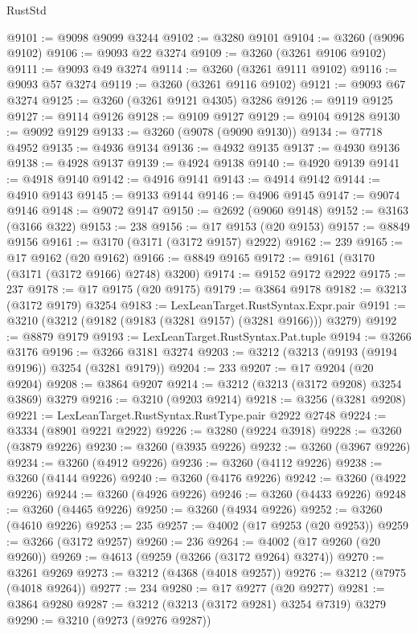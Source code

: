 \begin{lexlean}{RustStd}
\begin{coremodule}
{\begin{coremodule}
{{{{{{{{{{{{{{{{{{{{{{{{{{@9101 := @9098 @9099 @3244
@9102 := @3280 @9101
@9104 := @3260 (@9096 @9102)
@9106 := @9093 @22 @3274
@9109 := @3260 (@3261 @9106 @9102)
@9111 := @9093 @49 @3274
@9114 := @3260 (@3261 @9111 @9102)
@9116 := @9093 @57 @3274
@9119 := @3260 (@3261 @9116 @9102)
@9121 := @9093 @67 @3274
@9125 := @3260 (@3261 @9121 @4305) @3286
@9126 := @9119 @9125
@9127 := @9114 @9126
@9128 := @9109 @9127
@9129 := @9104 @9128
@9130 := @9092 @9129
@9133 := @3260 (@9078 (@9090 @9130))
@9134 := @7718 @4952
@9135 := @4936 @9134
@9136 := @4932 @9135
@9137 := @4930 @9136
@9138 := @4928 @9137
@9139 := @4924 @9138
@9140 := @4920 @9139
@9141 := @4918 @9140
@9142 := @4916 @9141
@9143 := @4914 @9142
@9144 := @4910 @9143
@9145 := @9133 @9144
@9146 := @4906 @9145
@9147 := @9074 @9146
@9148 := @9072 @9147
@9150 := @2692 (@9060 @9148)
@9152 := @3163 (@3166 @322)
@9153 := 238
@9156 := @17 @9153 (@20 @9153)
@9157 := @8849 @9156
@9161 := @3170 (@3171 (@3172 @9157) @2922)
@9162 := 239
@9165 := @17 @9162 (@20 @9162)
@9166 := @8849 @9165
@9172 := @9161 (@3170 (@3171 (@3172 @9166) @2748) @3200)
@9174 := @9152 @9172 @2922
@9175 := 237
@9178 := @17 @9175 (@20 @9175)
@9179 := @3864 @9178
@9182 := @3213 (@3172 @9179) @3254
@9183 := LexLeanTarget.RustSyntax.Expr.pair
@9191 := @3210 (@3212 (@9182 (@9183 (@3281 @9157) (@3281 @9166))) @3279)
@9192 := @8879 @9179
@9193 := LexLeanTarget.RustSyntax.Pat.tuple
@9194 := @3266 @3176
@9196 := @3266 @3181 @3274
@9203 := @3212 (@3213 (@9193 (@9194 @9196)) @3254 (@3281 @9179))
@9204 := 233
@9207 := @17 @9204 (@20 @9204)
@9208 := @3864 @9207
@9214 := @3212 (@3213 (@3172 @9208) @3254 @3869) @3279
@9216 := @3210 (@9203 @9214)
@9218 := @3256 (@3281 @9208)
@9221 := LexLeanTarget.RustSyntax.RustType.pair @2922 @2748
@9224 := @3334 (@8901 @9221 @2922)
@9226 := @3280 (@9224 @3918)
@9228 := @3260 (@3879 @9226)
@9230 := @3260 (@3935 @9226)
@9232 := @3260 (@3967 @9226)
@9234 := @3260 (@4912 @9226)
@9236 := @3260 (@4112 @9226)
@9238 := @3260 (@4144 @9226)
@9240 := @3260 (@4176 @9226)
@9242 := @3260 (@4922 @9226)
@9244 := @3260 (@4926 @9226)
@9246 := @3260 (@4433 @9226)
@9248 := @3260 (@4465 @9226)
@9250 := @3260 (@4934 @9226)
@9252 := @3260 (@4610 @9226)
@9253 := 235
@9257 := @4002 (@17 @9253 (@20 @9253))
@9259 := @3266 (@3172 @9257)
@9260 := 236
@9264 := @4002 (@17 @9260 (@20 @9260))
@9269 := @4613 (@9259 (@3266 (@3172 @9264) @3274))
@9270 := @3261 @9269
@9273 := @3212 (@4368 (@4018 @9257))
@9276 := @3212 (@7975 (@4018 @9264))
@9277 := 234
@9280 := @17 @9277 (@20 @9277)
@9281 := @3864 @9280
@9287 := @3212 (@3213 (@3172 @9281) @3254 @7319) @3279
@9290 := @3210 (@9273 (@9276 @9287))
}}}}}}}}}}}}}}}}}}}}}}}}}}
\end{coremodule}}
\end{coremodule}
\end{lexlean}
